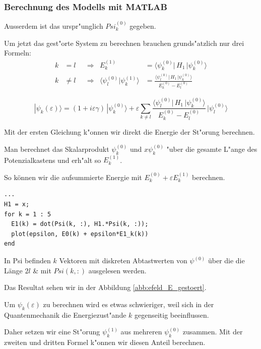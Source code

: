 \begin{refsection}
\subsubsection{Berechnung des Modells mit MATLAB}

Ausserdem ist das urspr"unglich $Psi_k^{(0)}$ gegeben.

Um jetzt das gest"orte System zu berechnen brauchen grunds"atzlich nur drei Formeln:
\begin{equation}
\begin{aligned}
k&=l
&&\Rightarrow&
E_k^{(1)}
&=
\langle \psi_k^{(0)}|\, H_1 \,|\psi_k^{(0)}\rangle
\\
k&\ne l
&&\Rightarrow&
\langle\psi_l^{(0)}|\psi_k^{(1)}\rangle
&=
\frac{\langle \psi_l^{(0)}|\, H_1 \,|\psi_k^{(0)}\rangle}{E_k^{(0)}-E_l^{(0)}}
\end{aligned}
\end{equation}

\begin{equation}
|\psi_k(\varepsilon)\rangle
=
(1+i\varepsilon \gamma)
\,|\psi_k^{(0)}\rangle
+
\varepsilon
\sum_{k\ne l}
\frac{\langle \psi_l^{(0)}|\, H_1 \,|\psi_k^{(0)}\rangle}{E_k^{(0)}-E_l^{(0)}}
\,
|\psi_l^{(0)}\rangle
\end{equation}

Mit der ersten Gleichung k"onnen wir direkt die Energie der St"orung berechnen.

Man berechnet das Skalarprodukt $\psi_k^{(0)}$ und $x \psi_k^{(0)}$ "uber 
die gesamte L"ange des Potenzialkastens und erh"alt so $E_k^{(1)}$.

So k\"onnen wir die aufsummierte Energie mit $E_k^{(0)} + \varepsilon E_k^{(1)}$ berechnen.

\begin{lstlisting}[style=Matlab]
...
H1 = x;
for k = 1 : 5
  E1(k) = dot(Psi(k, :), H1.*Psi(k, :));
  plot(epsilon, E0(k) + epsilon*E1_k(k))
end
\end{lstlisting}
In Psi befinden $k$ Vektoren mit diskreten Abtastwerten von $\psi^{(0)}$ \"uber die die L\"ange $2l$
\& mit $Psi(k, :)$ ausgelesen werden.

Das Resultat sehen wir in der Abbildung \ref{abb:efeld_E_gestoert}.

Um $\psi_k(\varepsilon)$ zu berechnen wird es etwas schwieriger, weil sich in der Quantenmechanik die Energiezust"ande $k$ gegenseitig beeinflussen.

Daher setzen wir eine St"orung $\psi_k^{(1)}$ aus mehreren $\psi_k^{(0)}$ zusammen.
Mit der zweiten und dritten Formel k"onnen wir diesen Anteil berechnen.


\end{refsection}
